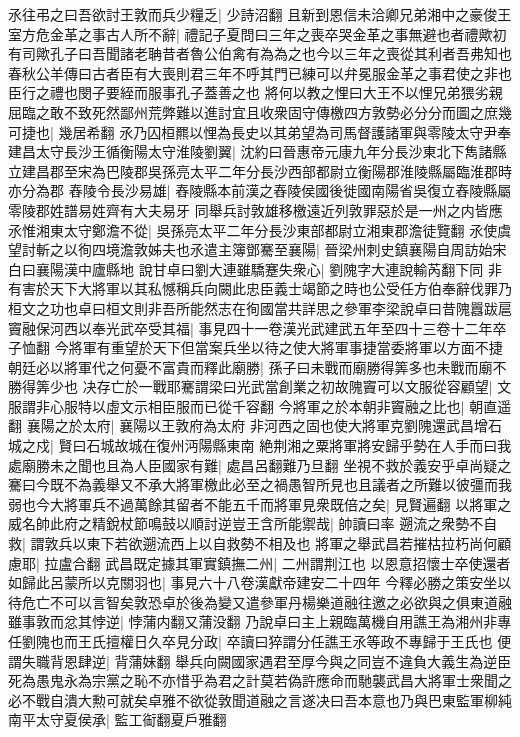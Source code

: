 氶往弔之曰吾欲討王敦而兵少糧乏|{
	少詩沼翻}
且新到恩信未洽卿兄弟湘中之豪俊王室方危金革之事古人所不辭|{
	禮記子夏問曰三年之喪卒哭金革之事無避也者禮歟初有司歟孔子曰吾聞諸老聃昔者魯公伯禽有為為之也今以三年之喪從其利者吾弗知也春秋公羊傳曰古者臣有大喪則君三年不呼其門已練可以弁冕服金革之事君使之非也臣行之禮也閔子要絰而服事孔子蓋善之也}
將何以教之悝曰大王不以悝兄弟猥劣親屈臨之敢不致死然鄙州荒弊難以進討宜且收衆固守傳檄四方敦勢必分分而圖之庶幾可捷也|{
	幾居希翻}
氶乃囚桓羆以悝為長史以其弟望為司馬督護諸軍與零陵太守尹奉建昌太守長沙王循衡陽太守淮陵劉翼|{
	沈約曰晉惠帝元康九年分長沙東北下雋諸縣立建昌郡至宋為巴陵郡吳孫亮太平二年分長沙西部都尉立衡陽郡淮陵縣屬臨淮郡時亦分為郡}
舂陵令長沙易雄|{
	舂陵縣本前漢之舂陵侯國後徙國南陽省吳復立舂陵縣屬零陵郡姓譜易姓齊有大夫易牙}
同舉兵討敦雄移檄遠近列敦罪惡於是一州之内皆應氶惟湘東太守鄭澹不從|{
	吳孫亮太平二年分長沙東部都尉立湘東郡澹徒覽翻}
氶使虞望討斬之以徇四境澹敦姊夫也氶遣主簿鄧騫至襄陽|{
	晉梁州刺史鎮襄陽自周訪始宋白曰襄陽漢中廬縣地}
說甘卓曰劉大連雖驕蹇失衆心|{
	劉隗字大連說輸芮翻下同}
非有害於天下大將軍以其私憾稱兵向闕此忠臣義士竭節之時也公受任方伯奉辭伐罪乃桓文之功也卓曰桓文則非吾所能然志在徇國當共詳思之參軍李梁說卓曰昔隗囂跋扈竇融保河西以奉光武卒受其福|{
	事見四十一卷漢光武建武五年至四十三卷十二年卒子恤翻}
今將軍有重望於天下但當案兵坐以待之使大將軍事捷當委將軍以方面不捷朝廷必以將軍代之何憂不富貴而釋此廟勝|{
	孫子曰未戰而廟勝得筭多也未戰而廟不勝得筭少也}
决存亡於一戰耶騫謂梁曰光武當創業之初故隗竇可以文服從容顧望|{
	文服謂非心服特以虛文示相臣服而已從千容翻}
今將軍之於本朝非竇融之比也|{
	朝直遥翻}
襄陽之於太府|{
	襄陽以王敦府為太府}
非河西之固也使大將軍克劉隗還武昌增石城之戍|{
	賢曰石城故城在復州沔陽縣東南}
絶荆湘之粟將軍將安歸乎勢在人手而曰我處廟勝未之聞也且為人臣國家有難|{
	處昌呂翻難乃旦翻}
坐視不救於義安乎卓尚疑之騫曰今既不為義舉又不承大將軍檄此必至之禍愚智所見也且議者之所難以彼彊而我弱也今大將軍兵不過萬餘其留者不能五千而將軍見衆既倍之矣|{
	見賢遍翻}
以將軍之威名帥此府之精銳杖節鳴鼓以順討逆豈王含所能禦哉|{
	帥讀曰率}
遡流之衆勢不自救|{
	謂敦兵以東下若欲遡流西上以自救勢不相及也}
將軍之舉武昌若摧枯拉朽尚何顧慮耶|{
	拉盧合翻}
武昌既定據其軍實鎮撫二州|{
	二州謂荆江也}
以恩意招懷士卒使還者如歸此呂蒙所以克關羽也|{
	事見六十八卷漢獻帝建安二十四年}
今釋必勝之策安坐以待危亡不可以言智矣敦恐卓於後為變又遣參軍丹楊樂道融往邀之必欲與之俱東道融雖事敦而忿其悖逆|{
	悖蒲内翻又蒲没翻}
乃說卓曰主上親臨萬機自用譙王為湘州非專任劉隗也而王氏擅權日久卒見分政|{
	卒讀曰猝謂分任譙王氶等政不專歸于王氏也}
便謂失職背恩肆逆|{
	背蒲妹翻}
舉兵向闕國家遇君至厚今與之同豈不違負大義生為逆臣死為愚鬼永為宗黨之恥不亦惜乎為君之計莫若偽許應命而馳襲武昌大將軍士衆聞之必不戰自潰大勲可就矣卓雅不欲從敦聞道融之言遂决曰吾本意也乃與巴東監軍柳純南平太守夏侯承|{
	監工䘖翻夏戶雅翻}
